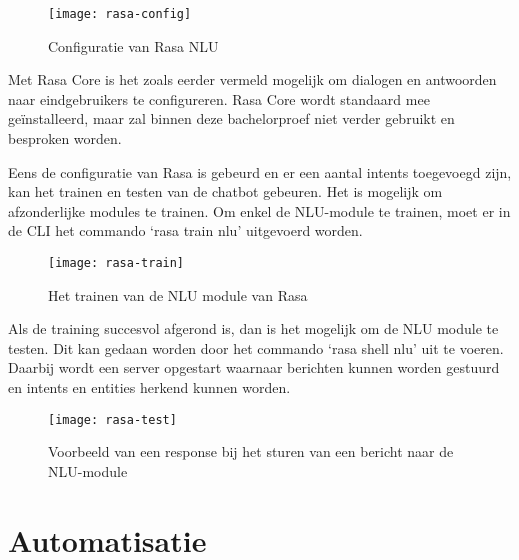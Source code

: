 \begin{figure}[H]
    \label{fig:rasa-config}
    \centering
    \texttt{[image: rasa-config]}
    \caption{Configuratie van Rasa NLU}
\end{figure}

Met Rasa Core is het zoals eerder vermeld mogelijk om dialogen en antwoorden naar eindgebruikers te configureren. Rasa Core wordt standaard mee geïnstalleerd, maar zal binnen deze bachelorproef niet verder gebruikt en besproken worden.

Eens de configuratie van Rasa is gebeurd en er een aantal intents toegevoegd zijn, kan het trainen en testen van de chatbot gebeuren. Het is mogelijk om afzonderlijke modules te trainen. Om enkel de NLU-module te trainen, moet er in de CLI het commando ‘rasa train nlu’ uitgevoerd worden.

\begin{figure}[H]
    \label{fig:rasa-train}
    \centering
    \texttt{[image: rasa-train]}
    \caption{Het trainen van de NLU module van Rasa}
\end{figure}

Als de training succesvol afgerond is, dan is het mogelijk om de NLU module te testen. Dit kan gedaan worden door het commando ‘rasa shell nlu’ uit te voeren. Daarbij wordt een server opgestart waarnaar berichten kunnen worden gestuurd en intents en entities herkend kunnen worden. 

\begin{figure}[H]
    \label{fig:rasa-test}
    \centering
    \texttt{[image: rasa-test]}
    \caption{Voorbeeld van een response bij het sturen van een bericht naar de NLU-module}
\end{figure}

\section{Automatisatie}
\label{sec:automatisatie}

